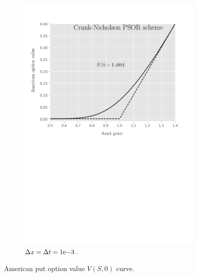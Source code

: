 \begin{figure}[tbp]
\begin{subfigure}{0.4\textwidth}
    \includegraphics[width=\textwidth]{chapters/chapter5/TestCase3CrankNicholsonLCP.pdf}
    \caption{$\Delta{x}=\Delta{t}={1}\mathrm{e}{-3}$.}
  \end{subfigure}
  \caption{American put option value $V(S, 0)$ curve.}
  \label{fig:lcp:numericaresults:test_case_3}
\end{figure}

